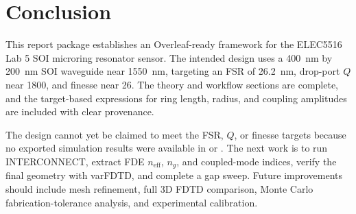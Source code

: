 \section{Conclusion}
This report package establishes an Overleaf-ready framework for the ELEC5516 Lab 5 SOI microring resonator sensor. The intended design uses a \SI{400}{\nano\metre} by \SI{200}{\nano\metre} SOI waveguide near \SI{1550}{\nano\metre}, targeting an FSR of \SI{26.2}{\nano\metre}, drop-port \(Q\) near 1800, and finesse near 26. The theory and workflow sections are complete, and the target-based expressions for ring length, radius, and coupling amplitudes are included with clear provenance.

The design cannot yet be claimed to meet the FSR, \(Q\), or finesse targets because no exported simulation results were available in  or . The next work is to run INTERCONNECT, extract FDE \(n_{\mathrm{eff}}\), \(n_g\), and coupled-mode indices, verify the final geometry with varFDTD, and complete a gap sweep. Future improvements should include mesh refinement, full 3D FDTD comparison, Monte Carlo fabrication-tolerance analysis, and experimental calibration.
